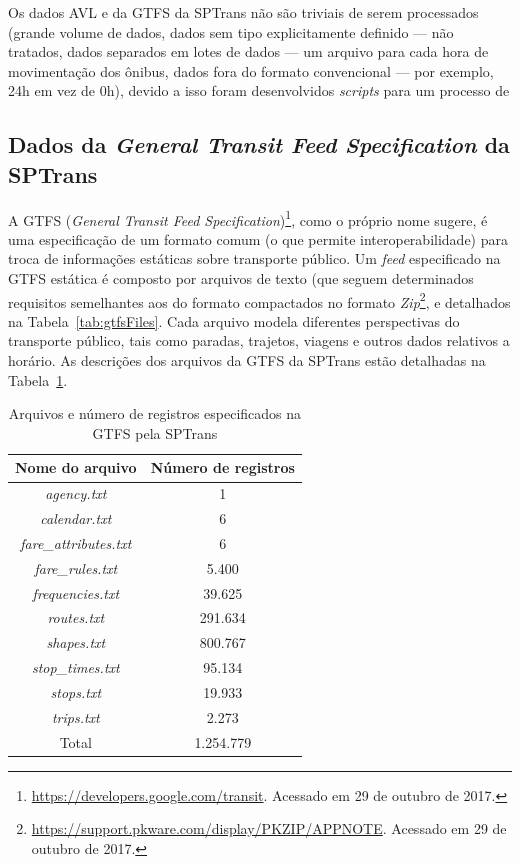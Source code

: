 \documentclass[
	12pt,				%
	oneside,			%
	a4paper,			%
	english,			%
	brazil				%
	]{abntex2ppgsi}
\begin{document}
{{{Os dados AVL e da GTFS da SPTrans não são triviais de serem processados (grande volume de dados, dados sem tipo explicitamente definido --- não tratados, dados separados em lotes de dados --- um arquivo para cada hora de movimentação dos ônibus, dados fora do formato convencional --- por exemplo, 24h em vez de 0h), devido a isso foram desenvolvidos \textit{scripts} para um processo de  

\subsection{Dados da \textit{General Transit Feed Specification} da SPTrans}
\label{gtfs}

A GTFS (\textit{General Transit Feed Specification})\footnote{\label{googleTransit}\url{https://developers.google.com/transit}. Acessado em 29 de outubro de 2017.}, como o próprio nome sugere, é uma especificação de um formato comum (o que permite interoperabilidade) para troca de informações estáticas sobre transporte público.  Um \textit{feed} especificado na GTFS estática é composto por arquivos de texto (que seguem determinados requisitos semelhantes aos do formato   compactados no formato \textit{Zip}\footnote{\url{https://support.pkware.com/display/PKZIP/APPNOTE}. Acessado em 29 de outubro de 2017.}, e detalhados na Tabela~\ref{tab:gtfsFiles}. Cada arquivo modela diferentes perspectivas do transporte público, tais como paradas, trajetos, viagens e outros dados relativos a horário. As descrições dos arquivos da GTFS da SPTrans estão detalhadas na Tabela~\ref{tab:gtfs}.


\begin{table}[!htb]
\centering
\caption{Arquivos e número de registros especificados na GTFS pela SPTrans}
	\label{tab:gtfs}
\begin{tabular}{c|c}
\toprule
\textbf{Nome do arquivo} & \textbf{Número de registros} \\ 
\midrule
\textit{agency.txt} & 1 \\ 
\hline
\textit{calendar.txt} & 6 \\ 
\hline
\textit{fare\_attributes.txt} & 6 \\ 
\hline
\textit{fare\_rules.txt} & 5.400 \\
\hline
\textit{frequencies.txt} & 39.625 \\
\hline
\textit{routes.txt} & 291.634 \\
\hline
\textit{shapes.txt} & 800.767 \\
\hline
\textit{stop\_times.txt} & 95.134 \\  
\hline
\textit{stops.txt} & 19.933 \\ 
\hline
\textit{trips.txt} & 2.273 \\
\midrule
\midrule
Total & 1.254.779 \\
\bottomrule
\end{tabular}
\end{table}

}}}
\end{document}
